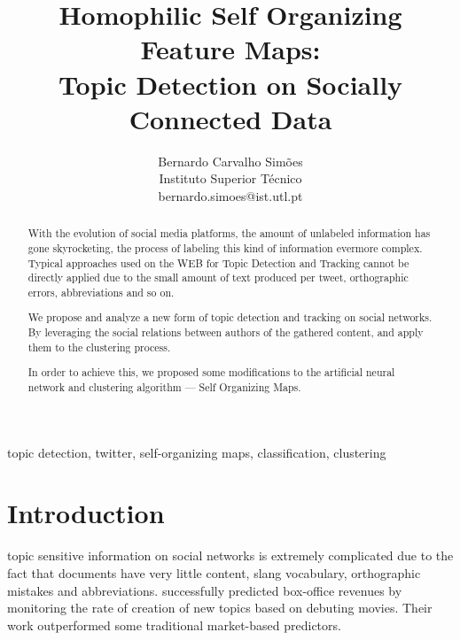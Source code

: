 \documentclass[journal]{IEEEtran}
\begin{document}
%
\title{Homophilic Self Organizing Feature Maps:\\ Topic Detection on Socially Connected Data}

\author{Bernardo Carvalho Simões \\Instituto Superior Técnico \\ bernardo.simoes@ist.utl.pt}

\maketitle

\begin{abstract}
With the evolution of social media platforms, the amount of unlabeled information has gone skyrocketing, the process of labeling this kind of information evermore complex. Typical approaches used on the WEB for Topic Detection and Tracking cannot be directly applied due to the small amount of text produced per tweet, orthographic errors, abbreviations and so on.

We propose and analyze a new form of topic detection and tracking on social networks. By leveraging the social relations between authors of the gathered content, and apply them to the clustering process.

In order to achieve this, we proposed some modifications to the artificial neural network  and clustering algorithm --- Self Organizing Maps. 
\end{abstract}

\begin{IEEEkeywords}
topic detection, twitter, self-organizing maps, classification, clustering
\end{IEEEkeywords}

\section{Introduction}
 topic sensitive information on social networks is extremely complicated due to the fact that documents have very little content, slang vocabulary, orthographic mistakes and abbreviations. \citet{Asur2010} successfully predicted box-office revenues by monitoring the rate of creation of new topics based on debuting movies. Their work outperformed some traditional market-based predictors.
\end{document}
